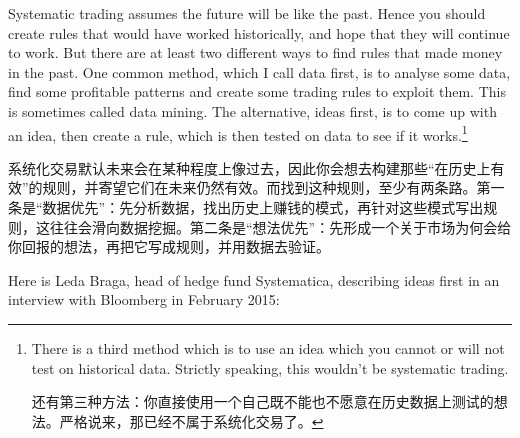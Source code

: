 


\begin{englishblock} Systematic trading assumes the future will be like the past. Hence you should create rules that would have worked historically, and hope that they will continue to work. But there are at least two different ways to find rules that made money in the past. One common method, which I call data first, is to analyse some data, find some profitable patterns and create some trading rules to exploit them. This is sometimes called data mining. The alternative, ideas first, is to come up with an idea, then create a rule, which is then tested on data to see if it works.\footnote{There is a third method which is to use an idea which you cannot or will not test on historical data. Strictly speaking, this wouldn't be systematic trading. \par 还有第三种方法：你直接使用一个自己既不能也不愿意在历史数据上测试的想法。严格说来，那已经不属于系统化交易了。}\end{englishblock}

\begin{chineseblock}系统化交易默认未来会在某种程度上像过去，因此你会想去构建那些“在历史上有效”的规则，并寄望它们在未来仍然有效。而找到这种规则，至少有两条路。第一条是“数据优先”：先分析数据，找出历史上赚钱的模式，再针对这些模式写出规则，这往往会滑向数据挖掘。第二条是“想法优先”：先形成一个关于市场为何会给你回报的想法，再把它写成规则，并用数据去验证。\end{chineseblock}

\bipairgap

\begin{englishblock} Here is Leda Braga, head of hedge fund Systematica, describing ideas first in an interview with Bloomberg in February 2015: \end{englishblock}

